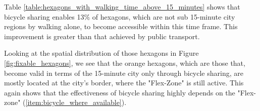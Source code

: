 Table \ref{table:hexagons_with_walking_time_above_15_minutes} shows that bicycle sharing enables 13\% of hexagons, which are not sub 15-minute city regions by walking alone, to become accessible within this time frame. 
This improvement is greater than that achieved by public transport.

Looking at the spatial distribution of those hexagons in Figure \ref{fig:fixable_hexagons}, we see that the orange hexagons, which are those that, become valid in terms of the 15-minute city only through bicycle sharing, are mostly located at the city's border, where the "Flex-Zone" is still active.
This again shows that the effectiveness of bicycle sharing highly depends on the "Flex-zone" (\ref{item:bicycle_where_available}).






